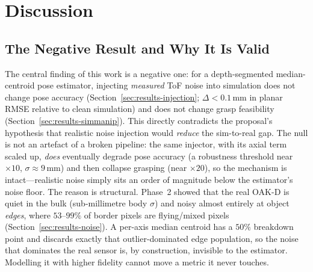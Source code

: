 \section{Discussion}
\label{sec:discussion}

\subsection{The Negative Result and Why It Is Valid}
\label{sec:disc-negative}
The central finding of this work is a negative one: for a depth-segmented
median-centroid pose estimator, injecting \emph{measured} ToF noise into
simulation does not change pose accuracy (Section~\ref{sec:results-injection};
$\Delta < 0.1$\,mm in planar RMSE relative to clean simulation) and does not
change grasp feasibility (Section~\ref{sec:results-simmanip}). This directly
contradicts the proposal's hypothesis that realistic noise injection would
\emph{reduce} the sim-to-real gap. The null is not an artefact of a broken
pipeline: the same injector, with its axial term scaled up, \emph{does}
eventually degrade pose accuracy (a robustness threshold near $\times 10$,
$\sigma \approx 9$\,mm) and then collapse grasping (near $\times 20$), so the
mechanism is intact---realistic noise simply sits an order of magnitude below
the estimator's noise floor. The reason is structural. Phase~2 showed that the
real OAK-D is quiet in the bulk (sub-millimetre body $\sigma$) and noisy almost
entirely at object \emph{edges}, where $53$--$99\%$ of border pixels are
flying/mixed pixels (Section~\ref{sec:results-noise}). A per-axis median centroid
has a $50\%$ breakdown point and discards exactly that outlier-dominated edge
population, so the noise that dominates the real sensor is, by construction,
invisible to the estimator. Modelling it with higher fidelity cannot move a
metric it never touches.

